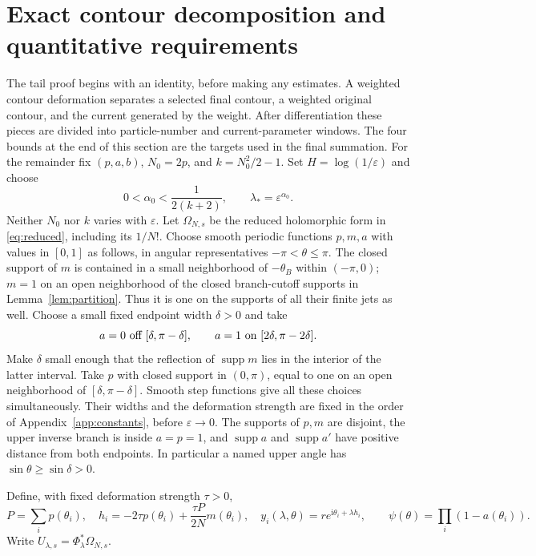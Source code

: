 \documentclass[11pt]{article}
\numberwithin{equation}{section}
\theoremstyle{definition}
\newcommand{\ii}{\mathrm i}
\newcommand{\eps}{\varepsilon}
\begin{document}
\section{Exact contour decomposition and quantitative requirements}
\label{sec:tailreduction}

The tail proof begins with an identity, before making any estimates.
A weighted contour deformation separates a selected final contour,
a weighted original contour, and the current generated by the weight.
After differentiation these pieces are divided into particle-number
and current-parameter windows. The four bounds at the end of this
section are the targets used in the final summation.
For the remainder fix \((p,a,b)\), \(N_0=2p\), and \(k=N_0^2/2-1\).
Set \(H=\log(1/\eps)\) and choose
\begin{equation}
 0<\alpha_0<\frac1{2(k+2)},\qquad \lambda_*=\eps^{\alpha_0}.
 \label{eq:alphachoice}
\end{equation}
Neither \(N_0\) nor \(k\) varies with \(\eps\).
Let \(\Omega_{N,s}\) be the reduced holomorphic form in
\eqref{eq:reduced}, including its \(1/N!\).
Choose smooth periodic functions \(p,m,a\) with values in \([0,1]\)
as follows, in angular representatives \(-\pi<\theta\le\pi\).
The closed support of \(m\) is contained in a small neighborhood of
\(-\theta_B\) within \((-\pi,0)\); \(m=1\) on an open neighborhood
of the closed branch-cutoff supports in Lemma~\ref{lem:partition}.
Thus it is one on the supports of all their finite jets as well.
Choose a small fixed endpoint width \(\delta>0\) and take
\[
 a=0\ \hbox{off }[\delta,\pi-\delta],\qquad
 a=1\ \hbox{on }[2\delta,\pi-2\delta].
\]
Make \(\delta\) small enough that the reflection of
\(\operatorname{supp}m\) lies in the interior of the latter interval.
Take \(p\) with closed support in \((0,\pi)\), equal to one on
an open neighborhood of \([\delta,\pi-\delta]\).
Smooth step functions give all these choices simultaneously.
Their widths and the deformation strength are fixed in the order
of Appendix~\ref{app:constants}, before \(\eps\to0\).
The supports of \(p,m\) are disjoint, the upper inverse branch is
inside \(a=p=1\), and \(\operatorname{supp}a\) and
\(\operatorname{supp}a'\) have positive distance from both endpoints.
In particular a named upper angle has \(\sin\theta\ge\sin\delta>0\).

Define, with fixed deformation strength \(\tau>0\),
\[
 P=\sum_i p(\theta_i),\quad
 h_i=-2\tau p(\theta_i)+\frac{\tau P}{2N}m(\theta_i),\quad
 y_i(\lambda,\theta)=r e^{\ii\theta_i+\lambda h_i},
 \qquad \psi(\theta)=\prod_i(1-a(\theta_i)).
\]
Write \(U_{\lambda,s}=\Phi_\lambda^*\Omega_{N,s}\).
\end{document}
